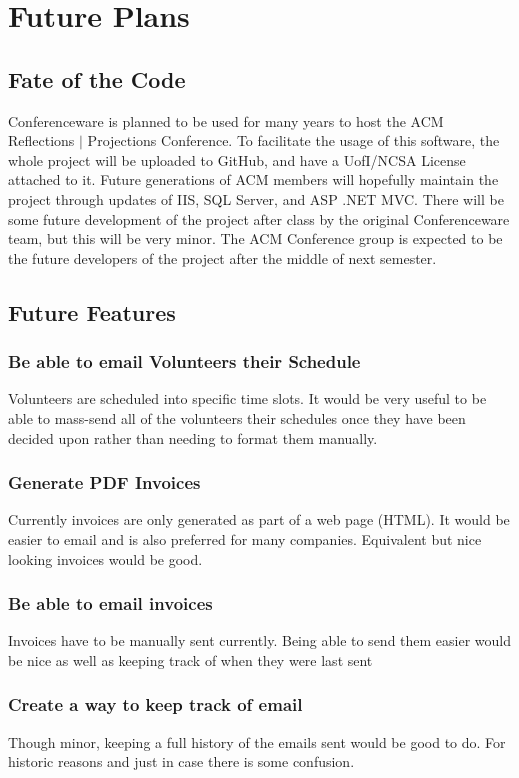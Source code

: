 \documentclass[12pt]{article}
\begin{document}
\newpage
\section{Future Plans}
\subsection{Fate of the Code}
Conferenceware is planned to be used for many years to host the ACM Reflections $|$ Projections Conference. To facilitate the usage of this software, the whole project will be uploaded to GitHub, and have a UofI/NCSA License attached to it. Future generations of ACM members will hopefully maintain the project through updates of IIS, SQL Server, and ASP .NET MVC. There will be some future development of the project after class by the original Conferenceware team, but this will be very minor. The ACM Conference group is expected to be the future developers of the project after the middle of next semester.
\subsection{Future Features}
\subsubsection{Be able to email Volunteers their Schedule}
Volunteers are scheduled into specific time slots. It would be very useful to be
able to mass-send all of the volunteers their schedules once they have been
decided upon rather than needing to format them manually.
\subsubsection{Generate PDF Invoices}
Currently invoices are only generated as part of a web page (HTML). It would be
easier to email and is also preferred for many companies. Equivalent but nice
looking invoices would be good.
\subsubsection{Be able to email invoices}
Invoices have to be manually sent currently. Being able to send them easier
would be nice as well as keeping track of when they were last sent
\subsubsection{Create a way to keep track of email}
Though minor, keeping a full history of the emails sent would be good to do. For
historic reasons and just in case there is some confusion.
\end{document}
